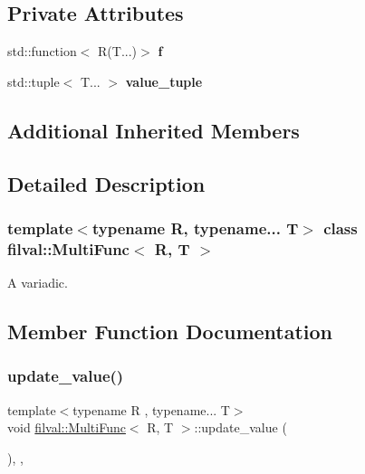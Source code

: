 \subsection*{Private Attributes}
\begin{DoxyCompactItemize}
\item 
\hypertarget{classfilval_1_1MultiFunc_a665dfa10714b17ff11eb02f3309cb336}{}\label{classfilval_1_1MultiFunc_a665dfa10714b17ff11eb02f3309cb336} 
std\+::function$<$ R(T...)$>$ {\bfseries f}
\item 
\hypertarget{classfilval_1_1MultiFunc_aae8b158353d6dfc2e35fadb804efe4e5}{}\label{classfilval_1_1MultiFunc_aae8b158353d6dfc2e35fadb804efe4e5} 
std\+::tuple$<$ T... $>$ {\bfseries value\+\_\+tuple}
\end{DoxyCompactItemize}
\subsection*{Additional Inherited Members}


\subsection{Detailed Description}
\subsubsection*{template$<$typename R, typename... T$>$\newline
class filval\+::\+Multi\+Func$<$ R, T $>$}

A variadic. 

\subsection{Member Function Documentation}
\hypertarget{classfilval_1_1MultiFunc_ad8552619e8a9d32401fb7ec84532648b}{}\label{classfilval_1_1MultiFunc_ad8552619e8a9d32401fb7ec84532648b} 
\subsubsection{\texorpdfstring{update\+\_\+value()}{update\_value()}}
{\footnotesize\ttfamily template$<$typename R , typename... T$>$ \\
void \hyperlink{classfilval_1_1MultiFunc}{filval\+::\+Multi\+Func}$<$ R, T $>$\+::update\+\_\+value (\begin{DoxyParamCaption}{ }\end{DoxyParamCaption})\hspace{0.3cm}{\ttfamily [inline]}, {\ttfamily [private]}, {\ttfamily [virtual]}}



